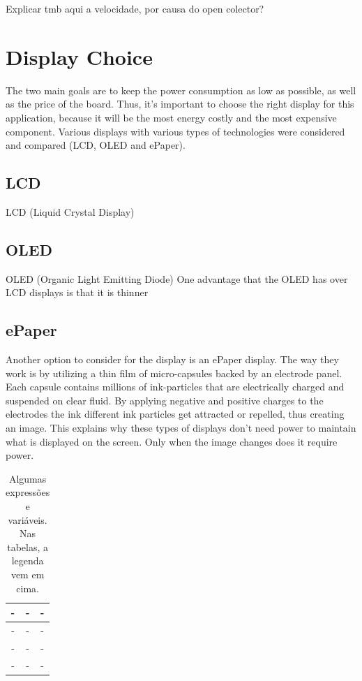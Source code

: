 \documentclass[portuguese]{ist-thesis}
\begin{document}
Explicar tmb aqui a velocidade, por causa do open colector?

\section{Display Choice}

The two main goals are to keep the power consumption as low as possible, as well as the price of the board. Thus, it's important to choose the right display for this application, because it will be the most energy costly and the most expensive component. Various displays with various types of technologies were considered and compared (LCD, OLED and ePaper). 

\subsection{LCD}
LCD (Liquid Crystal Display) 

\subsection{OLED}
OLED (Organic Light Emitting Diode)
One advantage that the OLED has over LCD displays is that it is thinner

\subsection{ePaper}
Another option to consider for the display is an ePaper display. 
The way they work is by utilizing a thin film of micro-capsules backed by an electrode panel. Each capsule contains millions of ink-particles that are electrically charged and suspended on clear fluid. By applying negative and positive charges to the electrodes the ink different ink particles get attracted or repelled, thus creating an image. This explains why these types of displays don't need power to maintain what is displayed on the screen. Only when the image changes does it require power. 

\begin{table}[ht]
	\centering                 
	\caption{Algumas expressões e variáveis. Nas tabelas, a legenda vem em cima.}
	\begin{tabular}{| c | c | c |}
            \hline
		- & - & - \\
		\hline
		- & - & - \\
		\hline
		- & - & - \\
		\hline
		- & - & - \\
		\hline
	\end{tabular}
	\label{tab:displays}
\end{table}
\end{document}
